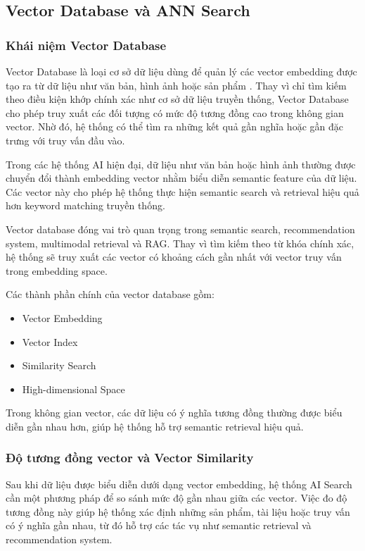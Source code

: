 \subsection{Vector Database và ANN Search}

\subsubsection{Khái niệm Vector Database}

Vector Database là loại cơ sở dữ liệu dùng để quản lý các vector embedding được tạo ra từ dữ liệu như văn bản, hình ảnh hoặc sản phẩm \parencite{wang2021milvus}. Thay vì chỉ tìm kiếm theo điều kiện khớp chính xác như cơ sở dữ liệu truyền thống, Vector Database cho phép truy xuất các đối tượng có mức độ tương đồng cao trong không gian vector. Nhờ đó, hệ thống có thể tìm ra những kết quả gần nghĩa hoặc gần đặc trưng với truy vấn đầu vào.

Trong các hệ thống AI hiện đại, dữ liệu như văn bản hoặc hình ảnh thường được chuyển đổi thành embedding vector nhằm biểu diễn semantic feature của dữ liệu. Các vector này cho phép hệ thống thực hiện semantic search và retrieval hiệu quả hơn keyword matching truyền thống.

Vector database đóng vai trò quan trọng trong semantic search, recommendation system, multimodal retrieval và RAG. Thay vì tìm kiếm theo từ khóa chính xác, hệ thống sẽ truy xuất các vector có khoảng cách gần nhất với vector truy vấn trong embedding space.

Các thành phần chính của vector database gồm:
\begin{itemize}
    \item Vector Embedding
    \item Vector Index
    \item Similarity Search
    \item High-dimensional Space
\end{itemize}

Trong không gian vector, các dữ liệu có ý nghĩa tương đồng thường được biểu diễn gần nhau hơn, giúp hệ thống hỗ trợ semantic retrieval hiệu quả.
\subsubsection{Độ tương đồng vector và Vector Similarity}

Sau khi dữ liệu được biểu diễn dưới dạng vector embedding, hệ thống AI Search cần một phương pháp để so sánh mức độ gần nhau giữa các vector. Việc đo độ tương đồng này giúp hệ thống xác định những sản phẩm, tài liệu hoặc truy vấn có ý nghĩa gần nhau, từ đó hỗ trợ các tác vụ như semantic retrieval và recommendation system.

